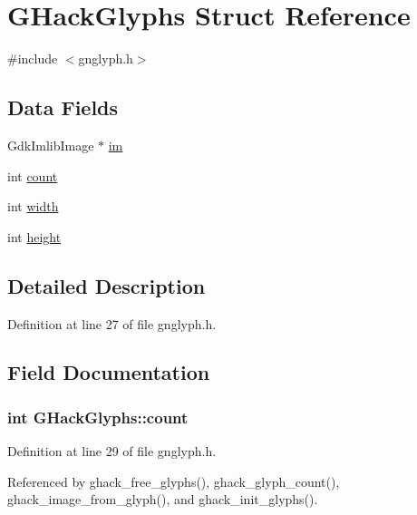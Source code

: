 \hypertarget{structGHackGlyphs}{\section{G\+Hack\+Glyphs Struct Reference}
\label{structGHackGlyphs}
}


{\ttfamily \#include $<$gnglyph.\+h$>$}

\subsection*{Data Fields}
\begin{DoxyCompactItemize}
\item 
Gdk\+Imlib\+Image $\ast$ \hyperlink{structGHackGlyphs_ad7cd303d094a7ba56caedb3b2b661298}{im}
\item 
int \hyperlink{structGHackGlyphs_a4c430be16070a4ce1982ae9752a072d0}{count}
\item 
int \hyperlink{structGHackGlyphs_a11710785ad9c133b74873d467215c793}{width}
\item 
int \hyperlink{structGHackGlyphs_a9cc7dbd7dc3fcca515ea36710138f589}{height}
\end{DoxyCompactItemize}


\subsection{Detailed Description}


Definition at line 27 of file gnglyph.\+h.



\subsection{Field Documentation}
\hypertarget{structGHackGlyphs_a4c430be16070a4ce1982ae9752a072d0}{
\subsubsection[{count}]{\setlength{\rightskip}{0pt plus 5cm}int G\+Hack\+Glyphs\+::count}}\label{structGHackGlyphs_a4c430be16070a4ce1982ae9752a072d0}


Definition at line 29 of file gnglyph.\+h.



Referenced by ghack\+\_\+free\+\_\+glyphs(), ghack\+\_\+glyph\+\_\+count(), ghack\+\_\+image\+\_\+from\+\_\+glyph(), and ghack\+\_\+init\+\_\+glyphs().

